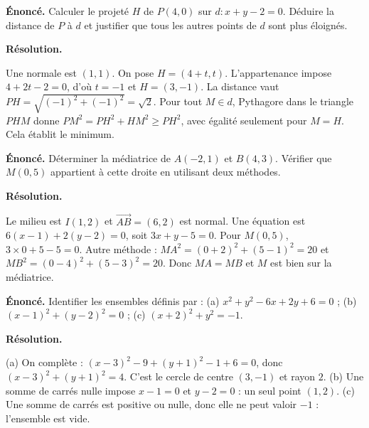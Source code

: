 \documentclass[11pt,a4paper]{article}
\begin{document}
\par\noindent\begin{minipage}{\linewidth}
{\small\color{Muted}\textbf{Énoncé.} Calculer le projeté $H$ de $P(4,0)$ sur $d:x+y-2=0$. Déduire la distance de $P$ à $d$ et justifier que tous les autres points de $d$ sont plus éloignés.}
\par\medskip
\textbf{Résolution.}\par
Une normale est $(1,1)$. On pose $H=(4+t,t)$. L’appartenance impose $4+2t-2=0$, d’où $t=-1$ et $H=(3,-1)$. La distance vaut $PH=\sqrt{(-1)^2+(-1)^2}=\sqrt2$. Pour tout $M\in d$, Pythagore dans le triangle $PHM$ donne $PM^2=PH^2+HM^2\ge PH^2$, avec égalité seulement pour $M=H$. Cela établit le minimum.
\end{minipage}\par
\par\noindent\begin{minipage}{\linewidth}
{\small\color{Muted}\textbf{Énoncé.} Déterminer la médiatrice de $A(-2,1)$ et $B(4,3)$. Vérifier que $M(0,5)$ appartient à cette droite en utilisant deux méthodes.}
\par\medskip
\textbf{Résolution.}\par
Le milieu est $I(1,2)$ et $\overrightarrow{AB}=(6,2)$ est normal. Une équation est $6(x-1)+2(y-2)=0$, soit $3x+y-5=0$. Pour $M(0,5)$, $3\times0+5-5=0$. Autre méthode : $MA^2=(0+2)^2+(5-1)^2=20$ et $MB^2=(0-4)^2+(5-3)^2=20$. Donc $MA=MB$ et $M$ est bien sur la médiatrice.
\end{minipage}\par
\par\noindent\begin{minipage}{\linewidth}
{\small\color{Muted}\textbf{Énoncé.} Identifier les ensembles définis par : (a) $x^2+y^2-6x+2y+6=0$ ; (b) $(x-1)^2+(y-2)^2=0$ ; (c) $(x+2)^2+y^2=-1$.}
\par\medskip
\textbf{Résolution.}\par
(a) On complète : $(x-3)^2-9+(y+1)^2-1+6=0$, donc $(x-3)^2+(y+1)^2=4$. C’est le cercle de centre $(3,-1)$ et rayon $2$. (b) Une somme de carrés nulle impose $x-1=0$ et $y-2=0$ : un seul point $(1,2)$. (c) Une somme de carrés est positive ou nulle, donc elle ne peut valoir $-1$ : l’ensemble est vide.
\end{minipage}\par
\end{document}
